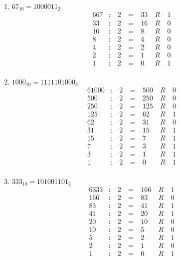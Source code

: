 \begin{enumerate}
\item $67_{10} = 1000011_2$
\begin{alignat*}{6}
67 & : & ~2 & ~=~ & 33 & ~R~ & 1 \\
33 & : & ~2 & ~=~ & 16 & ~R~ & 0 \\
16 & : & ~2 & ~=~ & 8 & ~R~ & 0 \\
8 & : & ~2 & ~=~ & 4 & ~R~ & 0 \\
4 & : & ~2 & ~=~ & 2 & ~R~ & 0 \\
2 & : & ~2 & ~=~ & 1 & ~R~ & 0 \\
1 & : & ~2 & ~=~ & 0 & ~R~ & 1 \\
\end{alignat*}

\item $1000_{10} = 1111101000_2$
\begin{alignat*}{6}
1000 & : & ~2 & ~=~ & 500 & ~R~ & 0 \\
500 & : & ~2 & ~=~ & 250 & ~R~ & 0 \\
250 & : & ~2 & ~=~ & 125 & ~R~ & 0 \\
125 & : & ~2 & ~=~ & 62 & ~R~ & 1 \\
62 & : & ~2 & ~=~ & 31 & ~R~ & 0 \\
31 & : & ~2 & ~=~ & 15 & ~R~ & 1 \\
15 & : & ~2 & ~=~ & 7 & ~R~ & 1 \\
7 & : & ~2 & ~=~ & 3 & ~R~ & 1 \\
3 & : & ~2 & ~=~ & 1 & ~R~ & 1 \\
1 & : & ~2 & ~=~ & 0 & ~R~ & 1 \\
\end{alignat*}

\item $333_{10} = 101001101_2$
\begin{alignat*}{6}
333 & : & ~2 & ~=~ & 166 & ~R~ & 1 \\
166 & : & ~2 & ~=~ & 83 & ~R~ & 0 \\
83 & : & ~2 & ~=~ & 41 & ~R~ & 1 \\
41 & : & ~2 & ~=~ & 20 & ~R~ & 1 \\
20 & : & ~2 & ~=~ & 10 & ~R~ & 0 \\
10 & : & ~2 & ~=~ & 5 & ~R~ & 0 \\
5 & : & ~2 & ~=~ & 2 & ~R~ & 1 \\
2 & : & ~2 & ~=~ & 1 & ~R~ & 0 \\
1 & : & ~2 & ~=~ & 0 & ~R~ & 1 \\
\end{alignat*}

\end{enumerate}

